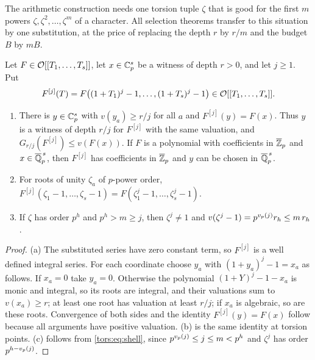 The arithmetic construction needs one torsion tuple $\zeta$ that is good for the first
$m$ powers $\zeta,\zeta^2,\dots,\zeta^m$ of a character. All selection theorems transfer
to this situation by one substitution, at the price of replacing the depth $r$ by $r/m$
and the budget $B$ by $mB$.

\begin{lemma}\label{tors:lem:powers}
Let $F\in\mathcal{O}[[T_1,\dots,T_s]]$, let $x\in\mathbb{C}_p^s$ be a witness of depth $r>0$, and let
$j\ge1$. Put
\[
  F^{[j]}(T)=F\bigl((1+T_1)^j-1,\dots,(1+T_s)^j-1\bigr)\in\mathcal{O}[[T_1,\dots,T_s]] .
\]
\begin{enumerate}[label=\textup{(\alph*)}]
\item There is $y\in\mathbb{C}_p^s$ with $v(y_a)\ge r/j$ for all $a$ and $F^{[j]}(y)=F(x)$. Thus
  $y$ is a witness of depth $r/j$ for $F^{[j]}$ with the same valuation, and
  $G_{r/j}(F^{[j]})\le v(F(x))$. If $F$ is a polynomial with coefficients in
  $\overline{\mathbb{Z}}_p$ and $x\in\overline{\mathbb{Q}}_p^{\,s}$, then $F^{[j]}$ has coefficients in
  $\overline{\mathbb{Z}}_p$ and $y$ can be chosen in $\overline{\mathbb{Q}}_p^{\,s}$.
\item For roots of unity $\zeta_a$ of $p$-power order,
  $F^{[j]}(\zeta_1-1,\dots,\zeta_s-1)=F(\zeta_1^j-1,\dots,\zeta_s^j-1)$.
\item If $\zeta$ has order $p^h$ and $p^h>m\ge j$, then $\zeta^j\ne1$ and
  $v(\zeta^j-1)=p^{v_p(j)}r_h\le m\,r_h$.
\end{enumerate}
\end{lemma}

\begin{proof}
(a) The substituted series have zero constant term, so $F^{[j]}$ is a well defined
integral series. For each coordinate choose $y_a$ with $(1+y_a)^j-1=x_a$ as follows. If
$x_a=0$ take $y_a=0$. Otherwise the polynomial $(1+Y)^j-1-x_a$ is monic and integral, so
its roots are integral, and their valuations sum to $v(x_a)\ge r$; at least one root has
valuation at least $r/j$; if $x_a$ is algebraic, so are these roots. Convergence of both
sides and the identity $F^{[j]}(y)=F(x)$ follow because all arguments have positive
valuation. (b) is the same identity at torsion
points. (c) follows from \eqref{tors:eq:shell}, since $p^{v_p(j)}\le j\le m<p^h$ and
$\zeta^j$ has order $p^{h-v_p(j)}$.
\end{proof}

